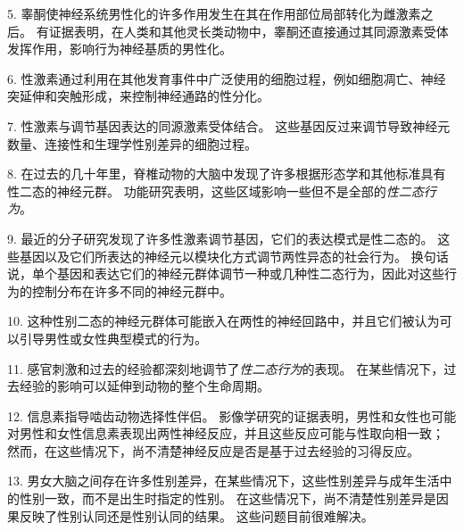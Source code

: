 5. 睾酮使神经系统男性化的许多作用发生在其在作用部位局部转化为雌激素之后。
有证据表明，在人类和其他灵长类动物中，睾酮还直接通过其同源激素受体发挥作用，影响行为神经基质的男性化。


6. 性激素通过利用在其他发育事件中广泛使用的细胞过程，例如细胞凋亡、神经突延伸和突触形成，来控制神经通路的性分化。


7. 性激素与调节基因表达的同源激素受体结合。
这些基因反过来调节导致神经元数量、连接性和生理学性别差异的细胞过程。


8. 在过去的几十年里，脊椎动物的大脑中发现了许多根据形态学和其他标准具有性二态的神经元群。
功能研究表明，这些区域影响一些但不是全部的\textit{性二态行为}。


9. 最近的分子研究发现了许多性激素调节基因，它们的表达模式是性二态的。
这些基因以及它们所表达的神经元以模块化方式调节两性异态的社会行为。
换句话说，单个基因和表达它们的神经元群体调节一种或几种性二态行为，因此对这些行为的控制分布在许多不同的神经元群中。


10. 这种性别二态的神经元群体可能嵌入在两性的神经回路中，并且它们被认为可以引导男性或女性典型模式的行为。


11. 感官刺激和过去的经验都深刻地调节了\textit{性二态行为}的表现。
在某些情况下，过去经验的影响可以延伸到动物的整个生命周期。


12. 信息素指导啮齿动物选择性伴侣。
影像学研究的证据表明，男性和女性也可能对男性和女性信息素表现出两性神经反应，并且这些反应可能与性取向相一致；
然而，在这些情况下，尚不清楚神经反应是否是基于过去经验的习得反应。


13. 男女大脑之间存在许多性别差异，在某些情况下，这些性别差异与成年生活中的性别一致，而不是出生时指定的性别。
在这些情况下，尚不清楚性别差异是因果反映了性别认同还是性别认同的结果。
这些问题目前很难解决。



